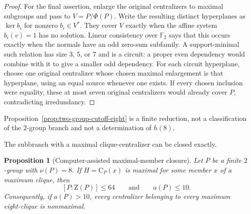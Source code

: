 \documentclass[11pt]{article}
\newtheorem{proposition}[theorem]{Proposition}
\theoremstyle{remark}
\newcommand{\nuG}{\nu}
\newcommand{\aG}{a}
\newcommand{\F}{\mathbb F}
\newcommand{\Z}{\mathrm Z}
\newcommand{\CG}{\mathrm C}
\begin{document}
\begin{proof}
For the final assertion, enlarge the original centralizers to maximal
subgroups and pass to $V=P/\Phi(P)$.  Write the resulting distinct
hyperplanes as $\ker b_i$ for nonzero $b_i\in V^*$.  They cover $V$
exactly when the affine system $b_i(v)=1$ has no solution.  Linear
consistency over $\F_2$ says that this occurs exactly when the normals have
an odd zero-sum subfamily.  A support-minimal such relation has size
$3$, $5$, or $7$ and is a circuit: a proper even dependency would combine
with it to give a smaller odd dependency.  For each circuit hyperplane,
choose one original centralizer whose chosen maximal enlargement is that
hyperplane, using an equal source whenever one exists.  If every chosen
inclusion were equality, these at most seven original centralizers would
already cover $P$, contradicting irredundancy.
\end{proof}

Proposition~\ref{prop:two-group-cutoff-eight} is a finite reduction, not a
classification of the $2$-group branch and not a determination of $h(8)$.

The subbranch with a maximal clique-centralizer can be closed exactly.

\begin{proposition}[Computer-assisted maximal-member closure]
\label{prop:two-group-maximal-member}
Let $P$ be a finite $2$-group with $\nuG(P)=8$.  If
$H=\CG_P(x)$ is maximal for some member $x$ of a maximum clique, then
\[
 [P:\Z(P)]\le64
 \qquad\text{and}\qquad
 \aG(P)\le10.
\]
Consequently, if $\aG(P)>10$, every centralizer belonging to every maximum
eight-clique is nonmaximal.
\end{proposition}
\end{document}
